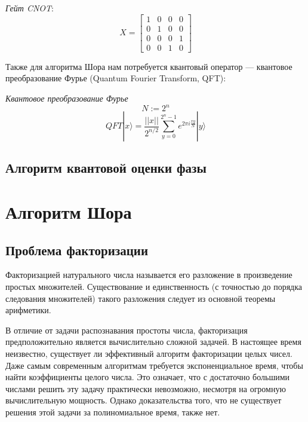 \documentclass[14pt]{article}
\begin{document}
	\textit{Гейт CNOT}:
	\begin{equation}
	X = \begin{bmatrix} 1 & 0 & 0 & 0 \\ 0 & 1 & 0 & 0 \\ 0 & 0 & 0 & 1 \\ 0 & 0 & 1 & 0 \end{bmatrix}
	\end{equation}	

	\newpage
	
	Также для алгоритма Шора нам потребуется квантовый оператор — квантовое преобразование Фурье (Quantum Fourier Transform, QFT):	

	\textit{Квантовое преобразование Фурье}
	\begin{equation}
		N := 2^n
	\end{equation}
	\begin{equation}
		QFT|x \rangle = \frac{||x||}{2^{n/2}} \sum_{y = 0}^{2^n-1}{e^{2 \pi i \frac{xy}{N}}} |y \rangle
	\end{equation}
	
	\newpage
	\subsection{Алгоритм квантовой оценки фазы}
	
	\newpage
	\section{Алгоритм Шора}	
	\subsection{Проблема факторизации}
	Факторизацией натурального числа называется его разложение в произведение простых множителей. Существование и единственность (с точностью до порядка следования множителей) такого разложения следует из основной теоремы арифметики.

В отличие от задачи распознавания простоты числа, факторизация предположительно является вычислительно сложной задачей. В настоящее время неизвестно, существует ли эффективный алгоритм факторизации целых чисел. Даже самым современным алгоритмам требуется экспоненциальное время, чтобы найти коэффициенты целого числа. Это означает, что с достаточно большими числами решить эту задачу практически невозможно, несмотря на огромную вычислительную мощность. Однако доказательства того, что не существует решения этой задачи за полиномиальное время, также нет.
\end{document}
